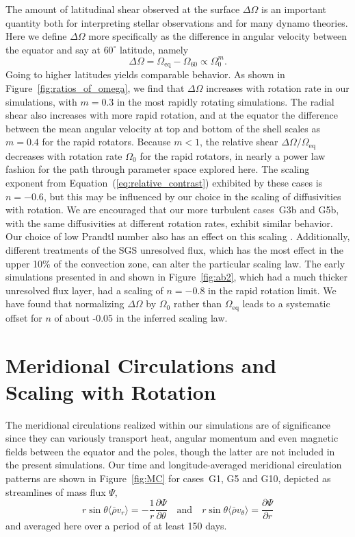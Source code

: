 The amount of latitudinal shear observed at the surface $\Delta
\Omega$ is an important quantity both for interpreting stellar
observations and for many 
dynamo theories.  Here we define $\Delta \Omega$ more specifically as the
difference in angular velocity between the equator and say at $60^\circ$
latitude, namely
\begin{equation}
  \Delta \Omega = \Omega_\mathrm{eq} - \Omega_{60} \propto \Omega_0^m.
  \label{eq:absolute_contrast}
\end{equation}
Going to higher latitudes yields comparable behavior.
As shown in Figure~\ref{fig:ratios_of_omega}, we find that
$\Delta \Omega$ increases with rotation rate in our simulations,
with $m=0.3$ in the most rapidly rotating simulations.  The radial shear also
increases with more rapid rotation, and at the equator the difference
between the mean angular velocity at top and bottom of the shell
scales as $m=0.4$ for the rapid rotators.
Because $m<1$, the relative shear $\Delta \Omega / \Omega_\mathrm{eq}$ 
decreases with rotation rate $\Omega_0$ for the rapid rotators, in nearly
a power law fashion for the path through parameter space explored
here.  The scaling exponent from Equation~(\ref{eq:relative_contrast})
exhibited by these cases is $n=-0.6$, but this 
may be influenced by our choice in the scaling of diffusivities with
rotation.  We are 
encouraged that our more turbulent cases~G3b and
G5b, with the same diffusivities at different rotation rates,
exhibit similar behavior.  Our choice of low Prandtl number also has an
effect on this scaling \citep[see ][]{Ballot_et_al_2007}.
Additionally, different treatments of  the SGS unresolved 
flux, which has the most effect in the upper 10\% of the convection
zone, can alter the particular scaling law.  The early simulations
presented in \cite{Brown_et_al_2004} and shown in
Figure~\ref{fig:ab2}, which had a much thicker unresolved flux layer,
had a scaling of $n=-0.8$ in the rapid rotation limit.  We have found
that normalizing $\Delta \Omega$ by $\Omega_0$ rather than
$\Omega_\mathrm{eq}$ leads to a systematic offset for $n$ of about -0.05 in
the inferred scaling law.




\clearpage

\section{Meridional Circulations and Scaling with Rotation}
\label{sec:MC}
The meridional circulations realized within our simulations are of
significance since they can variously transport heat, angular momentum
and even magnetic fields between the equator and the poles, though the
latter are not included in the present simulations.  Our time and
longitude-averaged meridional circulation patterns are shown in
Figure~\ref{fig:MC} for cases~G1, G5 and G10, depicted as streamlines
of mass flux $\Psi$,
\begin{equation}
  r \sin{\theta} \langle \bar{\rho} v_r \rangle = -\frac{1}{r}
  \frac{\partial \Psi}{\partial \theta} 
  \quad \mathrm{and} \quad
  r \sin{\theta} \langle \bar{\rho} v_\theta \rangle = \frac{\partial \Psi}{\partial r}
\end{equation}
and averaged here over a period of at least 150 days.

